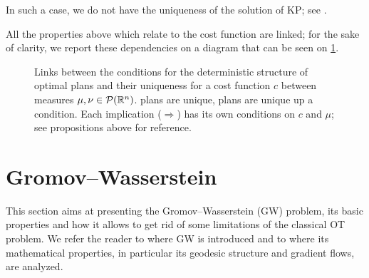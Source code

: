         \begin{remark}
            In such a case, we do not have the uniqueness of the solution of KP; see \cite{mccann2012rectifiability}.
        \end{remark}

        All the properties above which relate to the cost function are linked; for the sake of clarity, we report these dependencies on a diagram that can be seen on \cref{fig:diagram-uniqueness}.
        \begin{figure}[!h]
            \centering
            
            \caption[Links between the conditions for the deterministic structure of optimal plans and their uniqueness.]{Links between the conditions for the deterministic structure of optimal plans and their uniqueness for a cost function $c$ between measures $\mu,\nu\in\mathcal{P}(\mathbb{R}^n)$.  plans are unique,  plans are unique up a condition. Each implication ($\Rightarrow$) has its own conditions on $c$ and $\mu$; see propositions above for reference.}
            \label{fig:diagram-uniqueness}
        \end{figure}


\newpage
\section{Gromov--Wasserstein}
    \label{sec:gw}
    This section aims at presenting the Gromov--Wasserstein (GW) problem, its basic properties and how it allows to get rid of some limitations of the classical OT problem. We refer the reader to \cite{memoli2011gromov} where GW is introduced and to \cite{sturm2012space} where its mathematical properties, in particular its geodesic structure and gradient flows, are analyzed.

